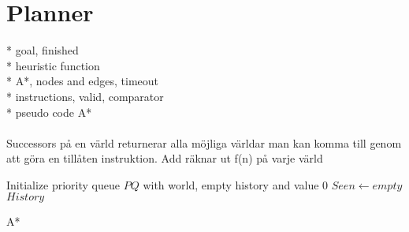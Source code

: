 \section{Planner}
* goal, finished \\
* heuristic function\\
* A*, nodes and edges, timeout\\
* instructions, valid, comparator\\
* pseudo code A*\\\\
Successors på en värld returnerar alla möjliga världar man kan komma till genom att göra en tillåten instruktion. Add räknar ut f(n) på varje värld
\begin{algorithm}[h!]
 \SetAlgoLined
 Initialize priority queue $PQ$ with world, empty history and value 0\;
 $Seen \leftarrow empty$\;
 \Return $History$
 \caption{A*}
 \label{algorithm:astar}
\end{algorithm}
